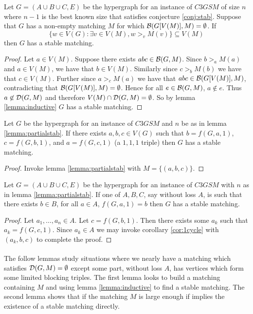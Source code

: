 \begin{lemma}\label{lemma:partialstab}
Let $G = (A\cup B \cup C, E)$ be the hypergraph for an instance of $C3GSM$ of size $n$ where $n-1$ is the best known size that  satisfies conjecture \ref{conj:stab}. Suppose that $G$ has a non-empty matching $M$ for which $\mathcal{B}(G[V(M)],M) = \emptyset$. If $$\{w \in V(G): \exists v \in V(M), w >_v M(v)\} \subseteq V(M)$$ then $G$ has a stable matching.
\end{lemma}
\begin{proof}
Let $a \in V(M)$. Suppose there exists $abc \in \mathcal{B}(G,M)$. Since $b >_a M(a)$ and $a \in V(M)$, we have that $b \in V(M)$. Similarly since $c >_b M(b)$ we have that $c \in V(M)$. Further since $a >_c M(a)$ we have that $abc \in \mathcal{B}(G[V(M)],M)$, contradicting that $\mathcal{B}(G[V(M)],M) = \emptyset$. Hence for all $e \in \mathcal{B}(G,M)$, $a \not\in e$. Thus $a\not \in \mathcal{D}(G,M)$ and therefore $V(M) \cap \mathcal{D}(G,M) = \emptyset$. So by lemma \ref{lemma:inductive} $G$ has a stable matching.
\end{proof}
\begin{corollary}\label{cor:1cycle}
Let $G$ be the hypergraph for an instance of $C3GSM$ and $n$ be as in lemma \ref{lemma:partialstab}. If there exists $a,b,c \in V(G)$ such that $b = f(G,a,1)$, $c = f(G,b,1)$, and $a = f(G,c,1)$ (a $1,1,1$ triple) then $G$ has a stable matching.
\end{corollary}
\begin{proof}
Invoke lemma \ref{lemma:partialstab} with $M = \{(a,b,c)\}$.
\end{proof}
\begin{corollary}
Let $G=(A\cup B \cup C, E)$ be the hypergraph for an instance of $C3GSM$ with $n$ as in lemma \ref{lemma:partialstab}. If one of $A,B,C$, say without loss $A$, is such that there exists $b \in B$, for all $a \in A$, $f(G,a,1) = b$ then $G$ has a stable matching.
\end{corollary}
\begin{proof}
Let $a_1, \dots, a_n \in A$. Let $c = f(G,b,1)$. Then there exists some $a_k$ such that $a_k = f(G,c,1)$. Since $a_k \in A$ we may invoke corollary \ref{cor:1cycle} with $(a_k, b, c)$ to complete the proof.
\end{proof}

\paragraph{}
The follow lemmas study situations where we nearly have a matching which satisfies $\mathcal{D}(G,M) = \emptyset$ except some part, without loss $A$, has vertices which form some limited blocking triples. The first lemma looks to build a matching containing $M$ and using lemma \ref{lemma:inductive} to find a stable matching. The second lemma shows that if the matching $M$ is large enough if implies the existence of a stable matching directly.

